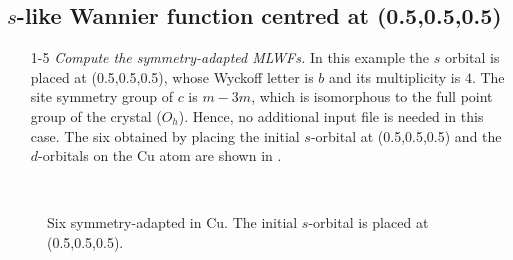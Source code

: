 \subsection*{$s$-like Wannier function centred at (0.5,0.5,0.5)}
\begin{itemize}
	\item [1-5] {\it Compute the symmetry-adapted MLWFs.}
	In this example the $s$ orbital is placed at (0.5,0.5,0.5), whose Wyckoff letter is $b$ and its multiplicity is $4$. The site symmetry group of $c$ is $m{-}3m$, which is  isomorphous to the full point group of the crystal ($O_h$). Hence, no additional input file is needed in this case.
	The six \MLWFs{} obtained by placing the initial $s$-orbital at (0.5,0.5,0.5) and the $d$-orbitals on the Cu atom are shown in .
\end{itemize}
\begin{figure}[h!]
	\centering
	\centering
	\centering
	\\
	\centering
	\centering
	\centering
	\caption{Six symmetry-adapted \MLWFs{} in Cu. The initial $s$-orbital is placed at (0.5,0.5,0.5).}
	\label{fig22.3}
	\end{figure}
